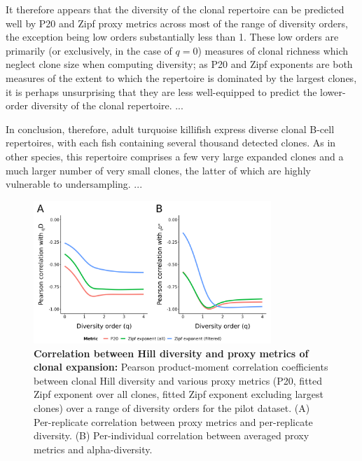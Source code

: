 It therefore appears that the diversity of the clonal repertoire can be predicted well by P20 and Zipf proxy metrics across most of the range of diversity orders, the exception being low orders substantially less than 1. These low orders are primarily (or exclusively, in the case of $q=0$) measures of clonal richness which neglect clone size when computing diversity; as P20 and Zipf exponents are both measures of the extent to which the repertoire is dominated by the largest clones, it is perhaps unsurprising that they are less well-equipped to predict the lower-order diversity of the clonal repertoire. %
... %

In conclusion, therefore, adult turquoise killifish express diverse clonal B-cell repertoires, with each fish containing several thousand detected clones. As in other species, this repertoire comprises a few very large expanded clones %
and a much larger number of very small clones, the latter of which are highly vulnerable to undersampling. ... %

\begin{figure}
\centering
\begin{subfigure}{0em}
\label{fig:igseq-pilot-clone-diversity-metrics-cor-rep}
\end{subfigure}
\begin{subfigure}{0em}
\label{fig:igseq-pilot-clone-diversity-metrics-cor-alpha}
\end{subfigure}
\includegraphics[width = 0.8\textwidth]{_Figures/png/pilot-clone-diversity-metrics-cor}
\caption[Correlation between Hill diversity and proxy metrics of clonal expansion]{\textbf{Correlation between Hill diversity and proxy metrics of clonal expansion:}
Pearson product-moment correlation coefficients between clonal Hill diversity and various proxy metrics (P20, fitted Zipf exponent over all clones, fitted Zipf exponent excluding largest clones) over a range of diversity orders for the \igseq pilot dataset. (A) Per-replicate correlation between proxy metrics and per-replicate diversity. (B) Per-individual correlation between averaged proxy metrics and alpha-diversity.}
\label{fig:igseq-pilot-clone-diversity-metrics-cor}
\end{figure}


